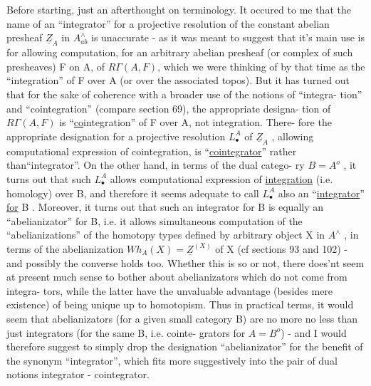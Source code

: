 Before starting, just an afterthought on terminology. It occured
to me that the name of an ``integrator''\hand{,} for a projective resolution of
the constant abelian presheaf $\underline{Z}_A$ in $A^{\wedge}_{ab}$\hand{,} is unaccurate - as it was meant
to suggest that it's main use is for allowing computation, for an
arbitrary abelian presheaf (or complex of such presheaves) F on A, of
$R\Gamma(A,F)$, which we were thinking of by that time as the ``integration''
of F over A (or over the associated topos). But it has turned out that
for the sake of coherence with a broader use of the notions of ``integra-%
tion'' and ``cointegration'' (compare section 69), the appropriate designa-%
tion of $R\Gamma(A,F)$ is ``\uline{co}integration'' of F over A, not integration. There-%
fore the appropriate designation for a projective resolution $L^A_{\bullet}$ of $\underline{Z}_A$ ,
allowing computational expression of cointegration, is ``\uline{cointegrator}''
 rather than``integrator''. On the other hand, in terms of the dual catego-%
ry $B=A^{o}$ , it turns out that such $L^A_{\bullet}$ allows computational expression of
\uline{integration} (i.e. homology) over B, and therefore it seems adequate to
call $L^A_{\bullet}$ also an ``\uline{integrator}'' \uline{for} B . Moreover, it turns out that such
an integrator for B is equally an ``abelianizator'' for B, i.e. it allows
simultaneous computation of the ``abelianizations'' of the homotopy types
defined by  arbitrary object X in $A^{\wedge}$ , in terms of the abelianization
$Wh_A(X) = \underline{Z}^{(X)}$ of X (cf sections 93 and 102) - and possibly the converse
holds too. Whether this is so or not, there does'nt seem at present
much sense to bother about abelianizators which do not come from integra-%
tors, while the latter have the unvaluable advantage  (besides
mere existence) of being unique up to homotopism. Thus in practical
terms, it would seem that abelianizators (for a given small category B)
are no more no less than just integrators (for the same B, i.e. cointe-%
grators for $A = B^{o}$) - and I would therefore suggest to simply drop the
designation ``abelianizator'' for the benefit of the synonym ``integrator'',
which fits more suggestively into the pair of dual notions integrator -
cointegrator.

